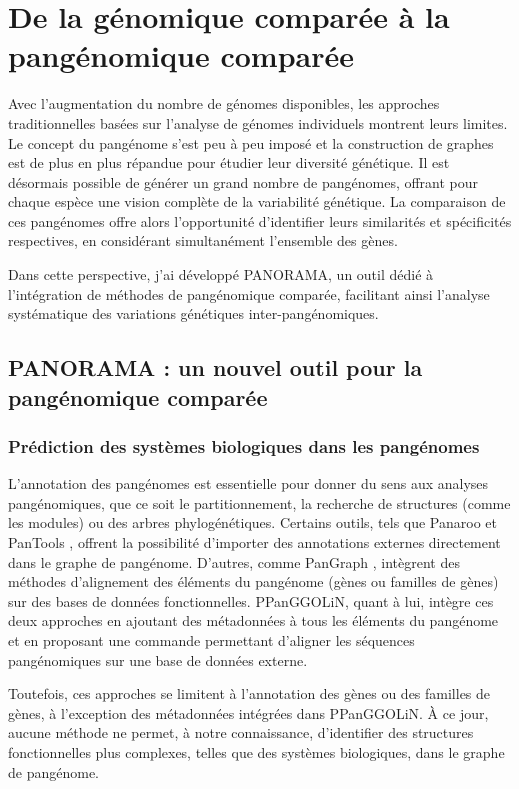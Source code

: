 \part{De la génomique comparée à la pangénomique comparée}
\label{part:PANORAMA}

Avec l’augmentation du nombre de génomes disponibles, les approches traditionnelles basées sur l’analyse de génomes individuels montrent leurs limites. Le concept du pangénome s'est peu à peu imposé et la construction de graphes est de plus en plus répandue pour étudier leur diversité génétique. Il est désormais possible de générer un grand nombre de pangénomes, offrant pour chaque espèce une vision complète de la variabilité génétique. La comparaison de ces pangénomes offre alors l’opportunité d’identifier leurs similarités et spécificités respectives, en considérant simultanément l’ensemble des gènes.

Dans cette perspective, j'ai développé PANORAMA, un outil dédié à l’intégration de méthodes de pangénomique comparée, facilitant ainsi l’analyse systématique des variations génétiques inter-pangénomiques.

\chapter{PANORAMA : un nouvel outil pour la pangénomique comparée}
\section{Prédiction des systèmes biologiques dans les pangénomes}

L’annotation des pangénomes est essentielle pour donner du sens aux analyses pangénomiques, que ce soit le partitionnement, la recherche de structures (comme les modules) ou des arbres phylogénétiques. Certains outils, tels que Panaroo \cite{tonkin-hill_producing_2020} et PanTools \cite{sheikhizadeh_pantools_2016}, offrent la possibilité d’importer des annotations externes directement dans le graphe de pangénome. D’autres, comme PanGraph \cite{noll_pangraph_2023}, intègrent des méthodes d’alignement des éléments du pangénome (gènes ou familles de gènes) sur des bases de données fonctionnelles. PPanGGOLiN, quant à lui, intègre ces deux approches en ajoutant des métadonnées à tous les éléments du pangénome et en proposant une commande permettant d’aligner les séquences pangénomiques sur une base de données externe.

Toutefois, ces approches se limitent à l’annotation des gènes ou des familles de gènes, à l’exception des métadonnées intégrées dans PPanGGOLiN. À ce jour, aucune méthode ne permet, à notre connaissance, d’identifier des structures fonctionnelles plus complexes, telles que des systèmes biologiques, dans le graphe de pangénome.

